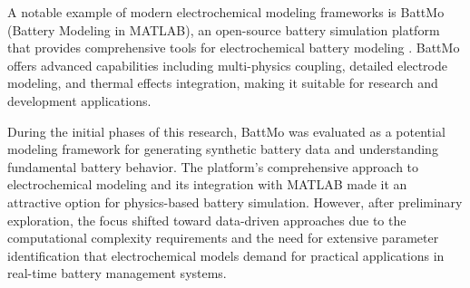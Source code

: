 \begin{itemize}
    A notable example of modern electrochemical modeling frameworks is BattMo (Battery Modeling in MATLAB), an open-source battery simulation platform that provides comprehensive tools for electrochemical battery modeling \cite{noauthor_battmo_2024}. BattMo offers advanced capabilities including multi-physics coupling, detailed electrode modeling, and thermal effects integration, making it suitable for research and development applications.

    During the initial phases of this research, BattMo was evaluated as a potential modeling framework for generating synthetic battery data and understanding fundamental battery behavior. The platform's comprehensive approach to electrochemical modeling and its integration with MATLAB made it an attractive option for physics-based battery simulation. However, after preliminary exploration, the focus shifted toward data-driven approaches due to the computational complexity requirements and the need for extensive parameter identification that electrochemical models demand for practical applications in real-time battery management systems.
\end{itemize}

